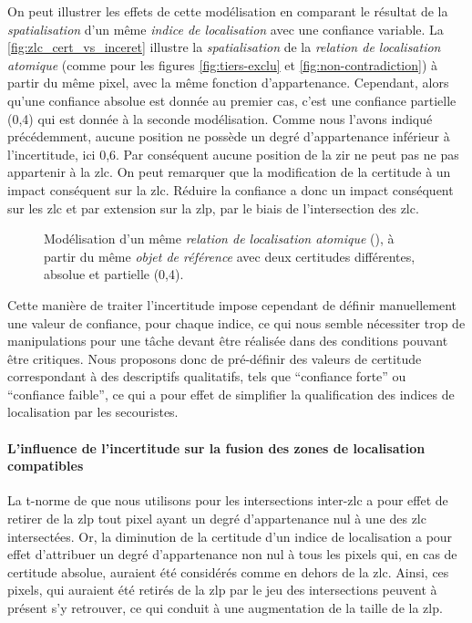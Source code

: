 On peut illustrer les effets de cette modélisation en comparant le
résultat de la \emph{spatialisation} d'un même \emph{indice de
  localisation} avec une confiance variable. La
\autoref{fig:zlc_cert_vs_inceret} illustre la \emph{spatialisation} de
la \emph{relation de localisation atomique} 
(comme pour les figures \ref{fig:tiers-exclu} et
\ref{fig:non-contradiction}) à partir du même pixel, avec la même
fonction d'appartenance. Cependant, alors qu'une confiance absolue est
donnée au premier cas, c'est une confiance partielle (0,4) qui est
donnée à la seconde modélisation. Comme nous l'avons indiqué
précédemment, aucune position ne possède un degré d'appartenance
inférieur à l'incertitude, ici 0,6. Par conséquent aucune position de
la \ac{zir} ne peut pas ne pas appartenir à la \ac{zlc}. On peut
remarquer que la modification de la certitude à un impact conséquent
sur la \ac{zlc}. Réduire la confiance a donc un impact conséquent sur
les \ac{zlc} et par extension sur la \ac{zlp}, par le biais de
l'intersection des \ac{zlc}.

\begin{figure}
  \centering
  \subfloat[]{}\hspace{2cm}
  \subfloat[]{}
  \caption{Modélisation d'un même \emph{relation de localisation
      atomique} (\protect{}), à partir du même
    \emph{objet de référence} avec deux certitudes différentes,
    absolue et partielle (0,4).}
  \label{fig:zlc_cert_vs_inceret}
\end{figure}

Cette manière de traiter l'incertitude impose cependant de définir
manuellement une valeur de confiance, pour chaque indice, ce qui nous
semble nécessiter trop de manipulations pour une tâche devant être
réalisée dans des conditions pouvant être critiques. Nous proposons
donc de pré-définir des valeurs de certitude correspondant à des
descriptifs qualitatifs, tels que \enquote{confiance forte} ou
\enquote{confiance faible}, ce qui a pour effet de simplifier la
qualification des indices de localisation par les secouristes.

\paragraph{L'influence de l'incertitude sur la fusion des zones de
  localisation compatibles}

La t-norme de  que nous utilisons pour les intersections
inter-\ac{zlc} a pour effet de retirer de la \ac{zlp} tout pixel ayant
un degré d'appartenance nul à une des \ac{zlc} intersectées. Or, la
diminution de la certitude d'un indice de localisation a pour effet
d'attribuer un degré d'appartenance non nul à tous les pixels qui, en
cas de certitude absolue, auraient été considérés comme en dehors de
la \ac{zlc}. Ainsi, ces pixels, qui auraient été retirés de la
\ac{zlp} par le jeu des intersections peuvent à présent s'y retrouver,
ce qui conduit à une augmentation de la taille de la \ac{zlp}.

